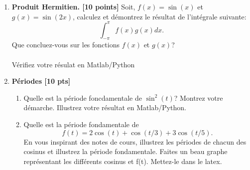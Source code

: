 \documentclass{article}
\begin{document}
\begin{enumerate}

\item {\bf Produit Hermitien. [10 points]} Soit, 
  $f(x) = \sin(x)$ et $g(x) = \sin(2x)$,
  calculez et démontrez le résultat de l'intégrale suivante: 
  $$
  \int_{-\pi}^{\pi} f(x) g(x) dx.
  $$
  Que concluez-vous sur les fonctions $f(x)$ et $g(x)$?
  \\
  \\
  Vérifiez votre résulat en Matlab/Python
\vspace{1cm}


\item  {\bf Périodes [10 pts]}
  \begin{enumerate}
    \vspace{0.5cm}
  \item Quelle est la période foncdamentale de $\sin^2(t)$? Montrez votre
    démarche. Illustrez votre résultat en Matlab/Python.
    \vspace{1cm}    
  \item Quelle est la période fondamentale de 
    $$
    f(t) = 2\cos(t) +    \cos(t/3) + 3\cos(t/5).  
    $$
    En vous inspirant des notes de cours, illustrez
    les périodes de chacun des cosinus et illustrez la période
    fondamentale. Faites un beau graphe représentant les différents
    cosinus et f(t). Mettez-le dans le latex.

\end{enumerate}

\newpage 


\end{enumerate}
\end{document}
